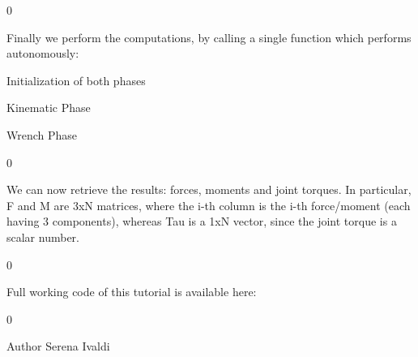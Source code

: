\begin{DoxyCode}{0}

\end{DoxyCode}


Finally we perform the computations, by calling a single function which performs autonomously\+:
\begin{DoxyEnumerate}
\item Initialization of both phases
\item Kinematic Phase
\item Wrench Phase
\end{DoxyEnumerate}


\begin{DoxyCode}{0}

\end{DoxyCode}


We can now retrieve the results\+: forces, moments and joint torques. In particular, F and M are 3xN matrices, where the i-\/th column is the i-\/th force/moment (each having 3 components), whereas Tau is a 1xN vector, since the joint torque is a scalar number.


\begin{DoxyCode}{0}

\end{DoxyCode}


Full working code of this tutorial is available here\+: 
\begin{DoxyCode}{0}

\end{DoxyCode}


\begin{DoxyAuthor}{Author}
Serena Ivaldi 
\end{DoxyAuthor}

